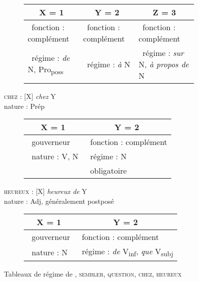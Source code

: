 \begin{figure}
\begin{subfigure}[h]{\textwidth}
\begin{tabularx}{\textwidth}{|X|X|X|}
			\hline
			\multicolumn{1}{|c|}{X = 1 } & \multicolumn{1}{c|}{Y = 2} & \multicolumn{1}{c|}{Z = 3}\\
			\hline
			\textbullet~fonction : complément  & \textbullet~fonction : complément  & \textbullet~fonction : complément \\
			\textbullet~régime : \textit{de} N, Pro\textsubscript{poss} & \textbullet~régime : \textit{à} N & \textbullet~régime : \textit{sur} N, \textit{à propos de} N \\
			\hline
		\end{tabularx}
	\end{subfigure}%
	\vfill
	\begin{flushleft}
		\textsc{chez} : [X] \textit{chez} Y \\
		nature : Prép
	\end{flushleft}
	\begin{subfigure}[h]{\textwidth}
		\centering
		\vspace*{-\baselineskip+5pt}
		\begin{tabularx}{\textwidth}{|X|X|}
			\hline
			\multicolumn{1}{|c|}{X = 1 } & \multicolumn{1}{c|}{Y = 2} \\
			\hline
			\textbullet~gouverneur & \textbullet~fonction : complément \\
			\textbullet~nature : V, N & \textbullet~régime : N \\
			& \textbullet~obligatoire \\
			\hline
		\end{tabularx}
	\end{subfigure}%
	\vfill
	\begin{flushleft}
		\textsc{heureux} : [X] \textit{heureux de} Y \\
		nature : Adj, généralement postposé
	\end{flushleft}
	\begin{subfigure}[h]{\textwidth}
		\centering
		\vspace*{-\baselineskip+5pt}
		\begin{tabularx}{\textwidth}{|X|X|}
			\hline
			\multicolumn{1}{|c|}{X = 1 } & \multicolumn{1}{c|}{Y = 2} \\
			\hline
			\textbullet~gouverneur & \textbullet~fonction : complément \\
			\textbullet~nature : N & \textbullet~régime : \textit{de} V\textsubscript{inf}, \textit{que} V\textsubscript{subj} \\
			\hline
		\end{tabularx}
	\end{subfigure}

\caption{Tableaux de régime de , \textsc{sembler}, \textsc{question}, \textsc{chez}, \textsc{heureux}\label{fig:13-regime}}
\end{figure}

